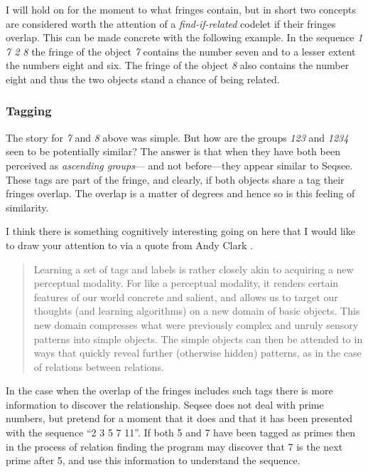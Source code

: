 \documentclass[letterpaper]{article}
\begin{document}
I will hold on for the moment to what fringes contain, but in short two concepts are considered worth the attention of a \emph{find-if-related} codelet if their fringes overlap.  This can be made concrete with the following example.  In the sequence \emph{1 7 2 8} the fringe of the object \emph{7} contains the number seven and to a lesser extent the numbers eight and six.  The fringe of the object \emph{8} also contains the number eight and thus the two objects stand a chance of being related.

\subsubsection{Tagging}
\label{sec:tagging}

The story for \emph{7} and \emph{8} above was simple.  But how are the groups \emph{123} and \emph{1234} seen to be potentially similar?  The answer is that when they have both been perceived as \emph{ascending groups}--- and not before---they appear similar to Seqsee.  These tags are part of the fringe, and clearly, if both objects share a tag their fringes overlap.  The overlap is a matter of degrees and hence so is this feeling of similarity.

I think there is something cognitively interesting going on here that I would like to draw your attention to via a quote from Andy Clark \cite{Clark:MindWare}.

\begin{quote}
Learning a set of tags and labels is rather closely akin to acquiring a new perceptual modality.  For like a perceptual modality, it renders certain features of our world concrete and salient, and allows us to target our thoughts (and learning algorithms) on a new domain of basic objects.  This new domain compresses what were previously complex and unruly sensory patterns into simple objects.  The simple objects can then be attended to in ways that quickly reveal further (otherwise hidden) patterns, as in the case of relations between relations.
\end{quote}


In the case when the overlap of the fringes includes such tags there is more information to discover the relationship.  Seqsee does not deal with prime numbers, but pretend for a moment that it does and that it has been presented with the sequence ``2 3 5 7 11''. If both 5 and 7 have been tagged as primes then in the process of relation finding the program may discover that 7 is the next prime after 5, and use this information to understand the sequence.
\end{document}
